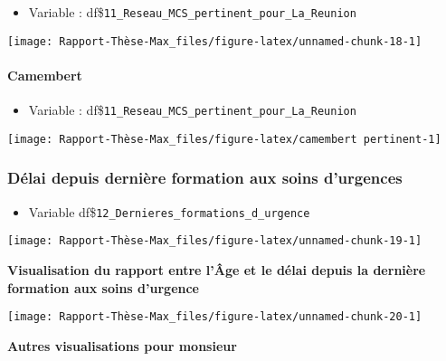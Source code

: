 \documentclass[
]{article}
\providecommand{\tightlist}{%
  \setlength{\itemsep}{0pt}\setlength{\parskip}{0pt}}
\begin{document}
\begin{itemize}
\tightlist
\item
  Variable : df\$\texttt{11\_Reseau\_MCS\_pertinent\_pour\_La\_Reunion}
\end{itemize}

\begin{center}\texttt{[image: Rapport-Thèse-Max\_files/figure-latex/unnamed-chunk-18-1]} \end{center}

\paragraph{Camembert}\label{camembert-1}

\begin{itemize}
\tightlist
\item
  Variable : df\$\texttt{11\_Reseau\_MCS\_pertinent\_pour\_La\_Reunion}
\end{itemize}

\begin{center}\texttt{[image: Rapport-Thèse-Max\_files/figure-latex/camembert pertinent-1]} \end{center}

\subsubsection{Délai depuis dernière formation aux soins
d'urgences}\label{duxe9lai-depuis-derniuxe8re-formation-aux-soins-durgences}

\begin{itemize}
\tightlist
\item
  Variable df\$\texttt{12\_Dernieres\_formations\_d\_urgence}
\end{itemize}

\begin{center}\texttt{[image: Rapport-Thèse-Max\_files/figure-latex/unnamed-chunk-19-1]} \end{center}

\textbf{Visualisation du rapport entre l'Âge et le délai depuis la
dernière formation aux soins d'urgence}

\begin{center}\texttt{[image: Rapport-Thèse-Max\_files/figure-latex/unnamed-chunk-20-1]} \end{center}

\hfill\break
\hfill\break

\textbf{Autres visualisations pour monsieur}
\end{document}
